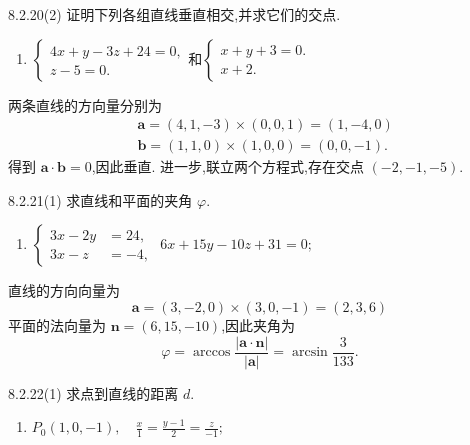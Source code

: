 \begin{exercise}{8.2.20(2)}
    证明下列各组直线垂直相交,并求它们的交点.
    \begin{enumerate}
        \item $\begin{cases}
            4x+y-3z+24=0,\\
            z-5=0.
        \end{cases}$和$\begin{cases}
            x+y+3=0.\\
            x+2.
        \end{cases}$
    \end{enumerate}
\end{exercise}

\begin{solution}
    两条直线的方向量分别为
\begin{align*}
    & \bm{a} = (4, 1, -3) \times (0, 0, 1) = (1, -4, 0)\\
    & \bm{b} = (1, 1, 0) \times (1, 0, 0) = (0, 0, -1).
\end{align*}
得到 $\bm{a} \cdot \bm{b} = 0$,因此垂直.
进一步,联立两个方程式,存在交点 $(-2, -1, -5)$.
\end{solution}

\begin{exercise}{8.2.21(1)}
     求直线和平面的夹角 $\varphi$.
        
        \begin{enumerate}
            \item 
            $
            \left\{
            \begin{aligned}
            3x - 2y &= 24, \\
            3x - z &= -4,
            \end{aligned}
            \right.$
            \quad $6x + 15y - 10z + 31 = 0;$
        \end{enumerate}
\end{exercise}

\begin{solution}
    直线的方向向量为
\[
\bm{a} = (3, -2, 0) \times (3, 0, -1) = (2, 3, 6)
\]
平面的法向量为 $\bm{n} = (6, 15, -10)$,因此夹角为
\[
\varphi = \arccos \frac{|\bm{a} \cdot \bm{n}|}{|\bm{a}|} = \arcsin \frac{3}{133}.
\]
\end{solution}


\begin{exercise}{8.2.22(1)}
    求点到直线的距离 $d$.
    
    \begin{enumerate}
        \item $P_0(1, 0, -1), \quad \frac{x}{1} = \frac{y-1}{2} = \frac{z}{-1};$
    \end{enumerate}
    \end{exercise}

